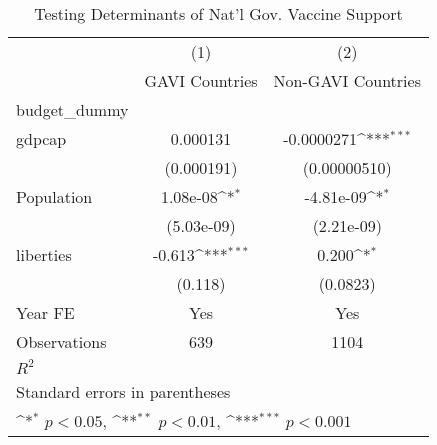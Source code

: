 \begin{table}[htbp]\centering
\def\sym#1{\ifmmode^{#1}\else\(^{#1}\)\fi}
\caption{Testing Determinants of Nat'l Gov. Vaccine Support}
\begin{tabular}{l*{2}{c}}
\toprule
                &\multicolumn{1}{c}{(1)}&\multicolumn{1}{c}{(2)}\\
                &\multicolumn{1}{c}{GAVI Countries}&\multicolumn{1}{c}{Non-GAVI Countries}\\
\midrule
budget\_dummy    &                  &                  \\
gdpcap          & 0.000131         &-0.0000271\sym{***}\\
                &(0.000191)         &(0.00000510)         \\
\addlinespace
Population      & 1.08e-08\sym{*}  &-4.81e-09\sym{*}  \\
                &(5.03e-09)         &(2.21e-09)         \\
\addlinespace
liberties       &   -0.613\sym{***}&    0.200\sym{*}  \\
                &  (0.118)         & (0.0823)         \\
\addlinespace
Year FE         &      Yes         &      Yes         \\
\midrule
Observations    &      639         &     1104         \\
\(R^{2}\)       &                  &                  \\
\bottomrule
\multicolumn{3}{l}{\footnotesize Standard errors in parentheses}\\
\multicolumn{3}{l}{\footnotesize \sym{*} \(p<0.05\), \sym{**} \(p<0.01\), \sym{***} \(p<0.001\)}\\
\end{tabular}
\end{table}
